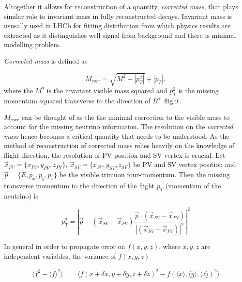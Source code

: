 Altogether it allows for reconstruction of a quantity, \textit{corrected mass}, that plays similar role to invariant mass in fully reconstructed decays. Invariant mass is ususally used in \Gls{LHCb} for fitting distribution from which physics results are extracted as it distinguishes well signal from background and there is minimal modelling problem.

\textit{Corrected mass} is defined as

\begin{equation}
	M_{corr} = \sqrt{{M}^{2} + |p^{2}_{T}|} + |p_{T}|,
\end{equation}	
where the $M^{2}$ is the invariant visible mass squared and $p^{2}_{T}$ is the missing momentum squared transverse to the direction of $B^{+}$ flight.


$M_{corr}$ can be thought of as the the minimal correction to the visible mass to account for the missing neutrino information. The resolution on the \textit{corrected mass} hence becomes a critical quantity that needs to be understood. As the method of reconstruction of corrected mass relies heavily on the knowledge of \Bpm flight direction, the resolution of \Gls{PV} position and \Gls{SV} vertex is crucial. Let $\vec{{x}}_{PV}=\{x_{PV},y_{PV},z_{PV}\}$, $\vec{{x}}_{SV}=\{x_{SV},y_{SV},z_{SV}\} $ be \Gls{PV} and \Gls{SV} vertex position and $\vec{p}=\{E,p_{x},p_{y},p_{z}\}$ be the visible trimuon four-momentum. Then the missing transverse momentum to the direction of the flight $p_{T}$ (momentum of the neutrino) is


\begin{equation}
	p^{2}_{T} = |\vec{p} - (\vec{{x}}_{SV}-\vec{{x}}_{PV})\frac{\vec{p} \cdot(\vec{{x}}_{SV}-\vec{{x}}_{PV})}{|(\vec{{x}}_{SV}-\vec{{x}}_{PV})|^{2}}|^{2}
\end{equation}

In general in order to propagate error on $f(x,y,z)$, where $x,y,z$ are independent variables, the variance of $f(x,y,z)$

\begin{equation}
\begin{aligned}
	\langle f^{2}-\langle f \rangle^{2} \rangle  &=  \langle f(x+\delta x, y+\delta y, z+\delta z)^{2} - f(\langle x \rangle, \langle y \rangle, \langle z \rangle)^{2} \rangle \\
\end{aligned}
\end{equation}

